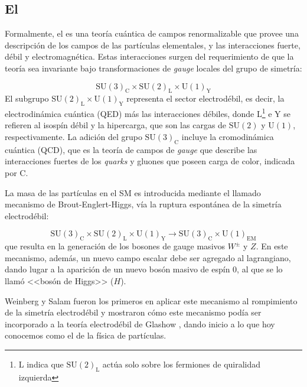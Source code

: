 \subsection{El \SM}

Formalmente, el {\SM} es una teoría cuántica de campos renormalizable que provee
una descripción de los campos de las partículas elementales, y las interacciones
fuerte, débil y electromagnética. Estas interacciones surgen del requerimiento
de que la teoría sea invariante bajo transformaciones de \emph{gauge} locales del grupo
de simetría:

\begin{equation}
  \text{SU}(3)_\text{C} \times \text{SU}(2)_\text{L} \times \text{U}(1)_\text{Y}
\end{equation}
%
El subgrupo $\text{SU}(2)_\text{L} \times \text{U}(1)_\text{Y}$ representa el sector
electrodébil, es decir, la electrodinámica cuántica (QED) más las interacciones
débiles, donde L\footnote{L indica que $\text{SU}(2)_\text{L}$ actúa solo sobre los
  fermiones de quiralidad izquierda} e Y se refieren al isospín débil y la
hipercarga, que son las cargas de $\text{SU}(2)$ y $\text{U}(1)$,
respectivamente. La adición del grupo $\text{SU}(3)_\text{C}$ incluye la cromodinámica
cuántica (QCD), que es la teoría de campos de \emph{gauge} que describe las
interacciones fuertes de los \emph{quarks} y gluones que poseen carga de color,
indicada por C.

La masa de las partículas en el SM es introducida mediante el llamado mecanismo
de Brout-Englert-Higgs\cite{PhysRevLett.13.321,PhysRevLett.13.508}, vía la
ruptura espontánea de la simetría electrodébil:

\begin{equation}
  \text{SU}(3)_\text{C} \times \text{SU}(2)_\text{L} \times \text{U}(1)_\text{Y} \to \text{SU}(3)_\text{C}
  \times \text{U}(1)_\text{EM}
\end{equation}
%
que resulta en la generación de los bosones de gauge masivos $W^\pm$ y $Z$.
En este mecanismo, además, un nuevo campo escalar debe ser agregado al
lagrangiano, dando lugar a la aparición de un nuevo bosón masivo de espín
0, al que se lo llamó <<bosón de Higgs>> ($H$).

Weinberg y Salam fueron los primeros en aplicar este mecanismo al
rompimiento de la simetría electrodébil
\cite{PhysRevLett.19.1264,PhysRev.127.965} y mostraron cómo este mecanismo podía
ser incorporado a la teoría electrodébil de Glashow \cite{Glashow1961579}, dando
inicio a lo que hoy conocemos como el {\SM} de la física de partículas.

